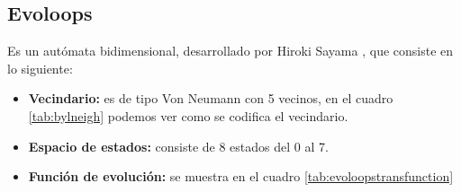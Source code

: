 \subsection{Evoloops}
Es un autómata bidimensional, desarrollado por Hiroki Sayama \citep{Sayama1998ConstructingES}, que consiste en lo siguiente:
\begin{itemize}
	\item \textbf{Vecindario:} es de tipo Von Neumann con 5 vecinos, en el cuadro \ref{tab:bylneigh} podemos ver como se codifica el vecindario.
	\item \textbf{Espacio de estados:} consiste de 8 estados del 0 al 7.
	\item \textbf{Función de evolución:} se muestra en el cuadro \ref{tab:evoloopstransfunction}
\end{itemize}

